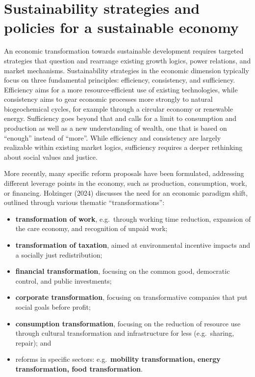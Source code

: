\documentclass[
  a4paper,
  DIV=11,
  numbers=noendperiod,
  oneside,
  openany]{scrreprt}
\begin{document}
\section{Sustainability strategies and policies for a sustainable
economy}\label{sustainability-strategies-and-policies-for-a-sustainable-economy}

An economic transformation towards sustainable development requires
targeted strategies that question and rearrange existing growth logics,
power relations, and market mechanisms. Sustainability strategies in the
economic dimension typically focus on three fundamental principles:
efficiency, consistency, and sufficiency. Efficiency aims for a more
resource-efficient use of existing technologies, while consistency aims
to gear economic processes more strongly to natural biogeochemical
cycles, for example through a circular economy or renewable energy.
Sufficiency goes beyond that and calls for a limit to consumption and
production as well as a new understanding of wealth, one that is based
on ``enough'' instead of ``more''. While efficiency and consistency are
largely realizable within existing market logics, sufficiency requires a
deeper rethinking about social values and justice.

More recently, many specific reform proposals have been formulated,
addressing different leverage points in the economy, such as production,
consumption, work, or financing. Holzinger (2024) discusses the need for
an economic paradigm shift, outlined through various thematic
``transformations'':

\begin{itemize}
\item
  \textbf{transformation of work}, e.g.~through working time reduction,
  expansion of the care economy, and recognition of unpaid work;
\item
  \textbf{transformation of taxation}, aimed at environmental incentive
  impacts and a socially just redistribution;
\item
  \textbf{financial transformation}, focusing on the common good,
  democratic control, and public investments;
\item
  \textbf{corporate transformation}, focusing on transformative
  companies that put social goals before profit;
\item
  \textbf{consumption transformation}, focusing on the reduction of
  resource use through cultural transformation and infrastructure for
  less (e.g.~sharing, repair); and
\item
  reforms in specific sectors: e.g.~\textbf{mobility transformation,
  energy transformation, food transformation}.
\end{itemize}
\end{document}
